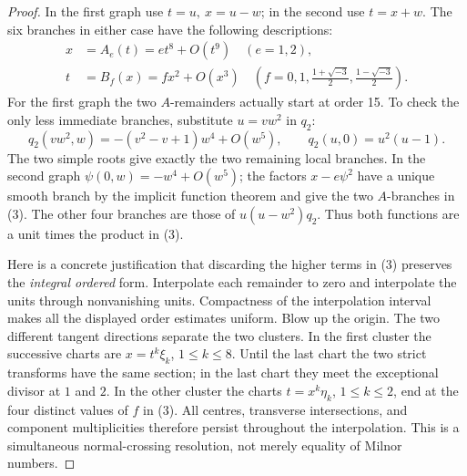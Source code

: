 \documentclass[11pt]{article}
\begin{document}
\begin{proof}
In the first graph use \(t=u,\ x=u-w\); in the second use \(t=x+w\).
The six branches in either case have the following descriptions:
\[
 \begin{aligned}
 x&=A_e(t)=e t^8+O(t^9)\quad(e=1,2),\\
 t&=B_f(x)=f x^2+O(x^3)
 \quad\left(f=0,1,\frac{1+\sqrt{-3}}2,\frac{1-\sqrt{-3}}2\right).
 \end{aligned}
                                                               \tag{3}
\]
For the first graph the two \(A\)-remainders actually start at order
15. To check the only less immediate branches, substitute
\(u=v w^2\) in \(q_2\):
\[
 q_2(vw^2,w)=-(v^2-v+1)w^4+O(w^5),\qquad
 q_2(u,0)=u^2(u-1).
\]
The two simple roots give exactly the two remaining local branches.
In the second graph \(\psi(0,w)=-w^4+O(w^5)\); the factors
\(x-e\psi^2\) have a unique smooth branch by the implicit function
theorem and give the two \(A\)-branches in (3).
The other four branches are those of \(u(u-w^2)q_2\).
Thus both functions are a unit times the product in (3).

Here is a concrete justification that discarding the higher terms in
(3) preserves the \emph{integral ordered} form. Interpolate each
remainder to zero and interpolate the units through nonvanishing
units. Compactness of the interpolation interval makes all the
displayed order estimates uniform. Blow up the origin. The two
different tangent directions separate the two clusters. In the first
cluster the successive charts are \(x=t^k \xi_k\), \(1\le k\le8\).
Until the last chart the two strict transforms have the same section;
in the last chart they meet the exceptional divisor at \(1\) and \(2\).
In the other cluster the charts \(t=x^k\eta_k\), \(1\le k\le2\),
end at the four distinct values of \(f\) in (3).
All centres, transverse intersections, and component multiplicities
therefore persist throughout the interpolation. This is a simultaneous
normal-crossing resolution, not merely equality of Milnor numbers.


\end{proof}
\end{document}

